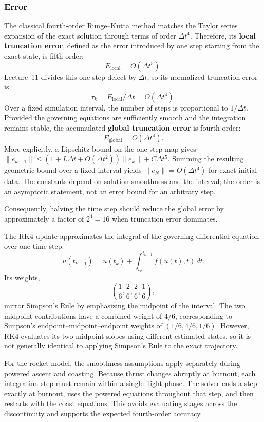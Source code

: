 \documentclass{article}
\begin{document}
\subsubsection{Error}%

The classical fourth-order Runge--Kutta method matches the Taylor
series expansion of the exact solution through terms of order
$\Delta t^4$. Therefore, its \textbf{local truncation error}, defined
as the error introduced by one step starting from the exact state,
is fifth order:
\[
E_{\mathrm{local}} = O(\Delta t^5).
\]
Lecture~11 divides this one-step defect by $\Delta t$, so its normalized truncation error is
\[
\tau_k=E_{\mathrm{local}}/\Delta t=O(\Delta t^4).
\]
Over a fixed simulation interval, the number of steps is proportional
to $1/\Delta t$. Provided the governing equations are sufficiently
smooth and the integration remains stable, the accumulated
\textbf{global truncation error} is fourth order:
\[
E_{\mathrm{global}} = O(\Delta t^4).
\]
More explicitly, a Lipschitz bound on the one-step map gives
$\|e_{k+1}\|\leq(1+L\Delta t+O(\Delta t^2))\|e_k\|+C\Delta t^5$.
Summing the resulting geometric bound over a fixed interval yields
$\|e_N\|=O(\Delta t^4)$ for exact initial data. The constants depend on solution smoothness and the interval; the order is an asymptotic statement, not an error bound for an arbitrary step.

Consequently, halving the time step should reduce the global error
by approximately a factor of $2^4 = 16$ when truncation error
dominates.

The RK4 update approximates the integral of the governing
differential equation over one time step:
\[
u(t_{k+1}) = u(t_k)
+ \int_{t_k}^{t_{k+1}} f(u(t),t)\,dt.
\]
Its weights,
\[
\left(\frac{1}{6},\frac{2}{6},\frac{2}{6},\frac{1}{6}\right),
\]
mirror Simpson's Rule by emphasizing the midpoint of the interval.
The two midpoint contributions have a combined weight of $4/6$,
corresponding to Simpson's endpoint--midpoint--endpoint weights
of $(1/6,4/6,1/6)$. However, RK4 evaluates its two midpoint slopes
using different estimated states, so it is not generally identical
to applying Simpson's Rule to the exact trajectory.

For the rocket model, the smoothness assumptions apply separately
during powered ascent and coasting. Because thrust changes abruptly
at burnout, each integration step must remain within a single flight
phase. The solver ends a step exactly at burnout, uses the powered
equations throughout that step, and then restarts with the coast
equations. This avoids evaluating stages across the discontinuity
and supports the expected fourth-order accuracy.
\end{document}
